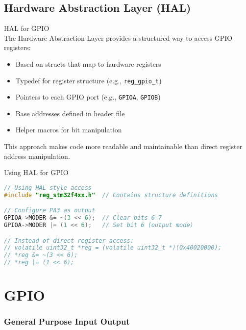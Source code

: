 \subsection{Hardware Abstraction Layer (HAL)}

\begin{concept}{HAL for GPIO}\\
The Hardware Abstraction Layer provides a structured way to access GPIO registers:
\begin{itemize}
    \item Based on structs that map to hardware registers
    \item Typedef for register structure (e.g., \texttt{reg\_gpio\_t})
    \item Pointers to each GPIO port (e.g., \texttt{GPIOA}, \texttt{GPIOB})
    \item Base addresses defined in header file
    \item Helper macros for bit manipulation
\end{itemize}
This approach makes code more readable and maintainable than direct register address manipulation.
\end{concept}

\begin{code}{Using HAL for GPIO}
\begin{lstlisting}[language=C, style=basesmol] 
// Using HAL style access
#include "reg_stm32f4xx.h"  // Contains structure definitions

// Configure PA3 as output
GPIOA->MODER &= ~(3 << 6);  // Clear bits 6-7
GPIOA->MODER |= (1 << 6);   // Set bit 6 (output mode)

// Instead of direct register access:
// volatile uint32_t *reg = (volatile uint32_t *)(0x40020000);
// *reg &= ~(3 << 6);
// *reg |= (1 << 6);
\end{lstlisting}
\end{code}


\section{GPIO}
\subsubsection{General Purpose Input Output}

